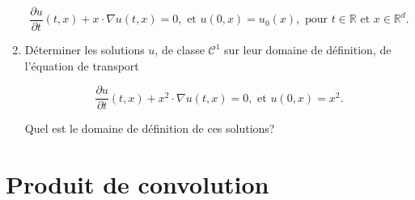 \documentclass[10pt,a4paper,oneside]{article}
\newenvironment{exercice}[1][Exercice]{\begin{trivlist}
\item[\hskip \labelsep {\bfseries #1}]}{\end{trivlist}}
\begin{document}
\begin{exercice}{4}
\begin{enumerate}
\[ \frac{\partial u}{\partial t}(t,x) + x \cdot \nabla u(t,x) = 0,\text{ et }u(0,x) = u_0(x), \text{ pour }t \in \mathbb{R} \text{ et } x \in \mathbb{R}^d. \]

\item
Déterminer les solutions $u$, de classe $\mathcal{C}^1$ sur leur domaine de définition, de l'équation de transport

\[ \frac{\partial u}{\partial t}(t,x) + x^2 \cdot \nabla u(t,x) = 0,\text{ et }u(0,x) = x^2. \]

Quel est le domaine de définition de ces solutions?

\end{enumerate}

\end{exercice}

\section{Produit de convolution}
\end{document}
